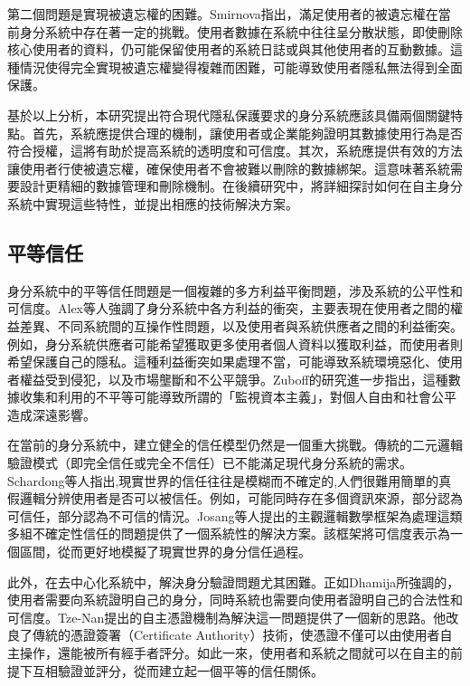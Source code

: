 第二個問題是實現被遺忘權的困難。Smirnova\cite{smirnova2024understanding}指出，滿足使用者的被遺忘權在當前身分系統中存在著一定的挑戰。使用者數據在系統中往往呈分散狀態，即使刪除核心使用者的資料，仍可能保留使用者的系統日誌或與其他使用者的互動數據。這種情況使得完全實現被遺忘權變得複雜而困難，可能導致使用者隱私無法得到全面保護。

基於以上分析，本研究提出符合現代隱私保護要求的身分系統應該具備兩個關鍵特點。首先，系統應提供合理的機制，讓使用者或企業能夠證明其數據使用行為是否符合授權，這將有助於提高系統的透明度和可信度。其次，系統應提供有效的方法讓使用者行使被遺忘權，確保使用者不會被難以刪除的數據綁架。這意味著系統需要設計更精細的數據管理和刪除機制。在後續研究中，將詳細探討如何在自主身分系統中實現這些特性，並提出相應的技術解決方案。
\subsection{平等信任}
身分系統中的平等信任問題是一個複雜的多方利益平衡問題，涉及系統的公平性和可信度。Alex等人\cite{preukschat2021self}強調了身分系統中各方利益的衝突，主要表現在使用者之間的權益差異、不同系統間的互操作性問題，以及使用者與系統供應者之間的利益衝突。例如，身分系統供應者可能希望獲取更多使用者個人資料以獲取利益，而使用者則希望保護自己的隱私。這種利益衝突如果處理不當，可能導致系統環境惡化、使用者權益受到侵犯，以及市場壟斷和不公平競爭。Zuboff\cite{zhang2010security}的研究進一步指出，這種數據收集和利用的不平等可能導致所謂的「監視資本主義」，對個人自由和社會公平造成深遠影響。

在當前的身分系統中，建立健全的信任模型仍然是一個重大挑戰。傳統的二元邏輯驗證模式（即完全信任或完全不信任）已不能滿足現代身分系統的需求。Schardong等人\cite{s22155641}指出,現實世界的信任往往是模糊而不確定的,人們很難用簡單的真假邏輯分辨使用者是否可以被信任。例如，可能同時存在多個資訊來源，部分認為可信任，部分認為不可信的情況。Josang等人\cite{josang2006exploring}提出的主觀邏輯數學框架為處理這類多組不確定性信任的問題提供了一個系統性的解決方案。該框架將可信度表示為一個區間，從而更好地模擬了現實世界的身分信任過程。

此外，在去中心化系統中，解決身分驗證問題尤其困難。正如Dhamija\cite{dhamija2008sevenflaws}所強調的，使用者需要向系統證明自己的身分，同時系統也需要向使用者證明自己的合法性和可信度。Tze-Nan\cite{NTU202102846}提出的自主憑證機制為解決這一問題提供了一個新的思路。他改良了傳統的憑證簽署（Certificate Authority）技術，使憑證不僅可以由使用者自主操作，還能被所有經手者評分。如此一來，使用者和系統之間就可以在自主的前提下互相驗證並評分，從而建立起一個平等的信任關係。

